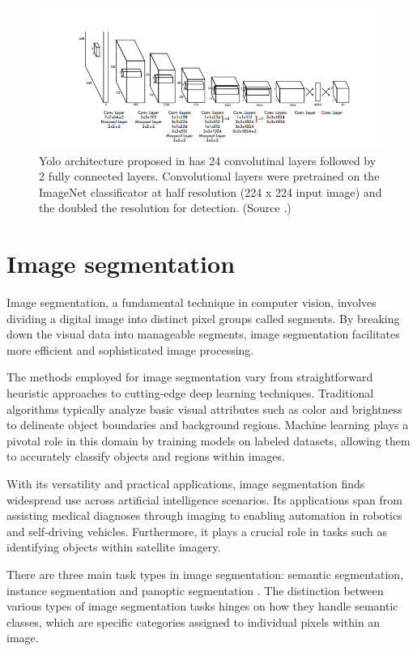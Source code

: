 \begin{figure}
  \centering
  \includegraphics[width=\linewidth]{text/chapter_03/imgs/YOLO_architecture}
  \caption{Yolo architecture proposed in \cite{YOLORedmon2016} has 24 convolutinal layers followed by 2 fully connected layers. Convolutional layers were pretrained on the ImageNet classificator at half resolution (224 x 224 input image) and the doubled the resolution for detection. (Source \cite{YOLORedmon2016}.)}
  \label{fig:yoloArchitecture}
\end{figure}


\section{Image segmentation}
Image segmentation, a fundamental technique in computer vision, involves dividing a digital image into distinct pixel groups called segments. By breaking down the visual data into manageable segments, image segmentation facilitates more efficient and sophisticated image processing.

The methods employed for image segmentation vary from straightforward heuristic approaches to cutting-edge deep learning techniques. Traditional algorithms typically analyze basic visual attributes such as color and brightness to delineate object boundaries and background regions. Machine learning plays a pivotal role in this domain by training models on labeled datasets, allowing them to accurately classify objects and regions within images.

With its versatility and practical applications, image segmentation finds widespread use across artificial intelligence scenarios. Its applications span from assisting medical diagnoses through imaging to enabling automation in robotics and self-driving vehicles. Furthermore, it plays a crucial role in tasks such as identifying objects within satellite imagery.

There are three main task types in image segmentation: semantic segmentation, instance segmentation and panoptic segmentation \cite{IBM}.
The distinction between various types of image segmentation tasks hinges on how they handle semantic classes, which are specific categories assigned to individual pixels within an image.


